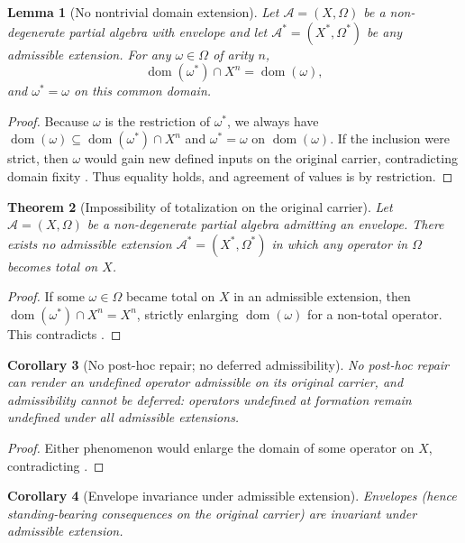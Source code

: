\documentclass[11pt]{article}
\newtheorem{theorem}{Theorem}[section]
\newtheorem{lemma}[theorem]{Lemma}
\newtheorem{corollary}[theorem]{Corollary}
\theoremstyle{definition}
\newcommand{\pdom}{\operatorname{dom}}
\begin{document}
\begin{lemma}[No nontrivial domain extension]
\label{lem:no-domain-extension}
Let $\mathcal{A}=(X,\Omega)$ be a non-degenerate partial algebra with envelope and let $\mathcal{A}^*=(X^*,\Omega^*)$ be any admissible extension.
For any $\omega\in\Omega$ of arity $n$,
\[
\pdom(\omega^*)\cap X^n = \pdom(\omega),
\]
and $\omega^*=\omega$ on this common domain.
\end{lemma}

\begin{proof}
Because $\omega$ is the restriction of $\omega^*$, we always have $\pdom(\omega)\subseteq \pdom(\omega^*)\cap X^n$ and $\omega^*=\omega$ on $\pdom(\omega)$.
If the inclusion were strict, then $\omega$ would gain new defined inputs on the original carrier, contradicting domain fixity .
Thus equality holds, and agreement of values is by restriction.
\end{proof}

\begin{theorem}[Impossibility of totalization on the original carrier]
\label{thm:no-totalization}
Let $\mathcal{A}=(X,\Omega)$ be a non-degenerate partial algebra admitting an envelope.
There exists no admissible extension $\mathcal{A}^*=(X^*,\Omega^*)$ in which any operator in $\Omega$ becomes total on $X$.
\end{theorem}

\begin{proof}
If some $\omega\in\Omega$ became total on $X$ in an admissible extension, then $\pdom(\omega^*)\cap X^n=X^n$, strictly enlarging $\pdom(\omega)$ for a non-total operator.
This contradicts .
\end{proof}

\begin{corollary}[No post-hoc repair; no deferred admissibility]
\label{cor:no-deferred}
No post-hoc repair can render an undefined operator admissible on its original carrier, and admissibility cannot be deferred: operators undefined at formation remain undefined under all admissible extensions.
\end{corollary}

\begin{proof}
Either phenomenon would enlarge the domain of some operator on $X$, contradicting .
\end{proof}

\begin{corollary}[Envelope invariance under admissible extension]
\label{cor:envelope-invariance}
Envelopes (hence standing-bearing consequences on the original carrier) are invariant under admissible extension.
\end{corollary}
\end{document}
